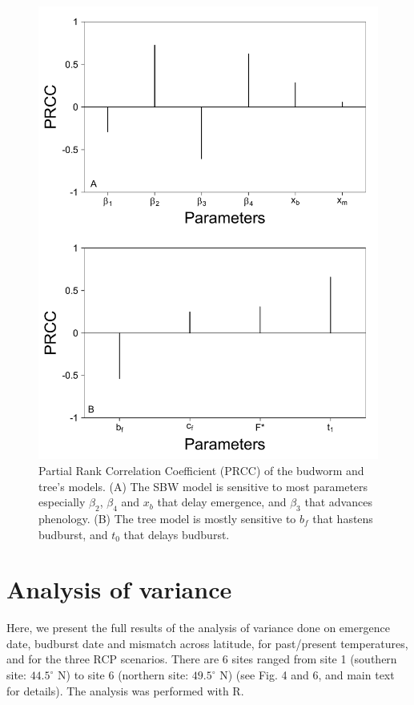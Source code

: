 \documentclass[12 pt]{article}
\begin{document}
\begin{figure}[ht]
\begin{center}
\renewcommand{\thefigure}{S\arabic{figure}}
\includegraphics[width = 14 cm, keepaspectratio]{Sensitivity}
\caption{\doublespacing Partial Rank Correlation Coefficient (PRCC) of the budworm and tree's models. (A) The SBW model is sensitive to most parameters especially $\beta _2$, $\beta _4$ and $x_b$ that delay emergence, and $\beta _3$ that advances phenology. (B) The tree model is mostly sensitive to $b_f$  that hastens budburst, and $t_0$ that delays budburst.}
\end{center}
\end{figure}

\clearpage

\section{Analysis of variance}
Here, we present  the full results of the analysis of variance done on emergence date, budburst date and mismatch across latitude, for past/present temperatures, and for the three RCP scenarios. There are $6$ sites ranged from site 1 (southern site: $44.5^{\circ}$ N) to site 6 (northern site: $49.5^{\circ}$ N) (see Fig. 4 and 6, and main text for details). The analysis was performed with R.
\end{document}
